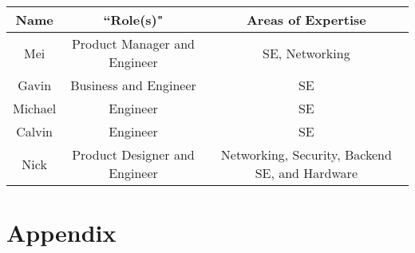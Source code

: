 \documentclass[10pt]{article}
\begin{document}
\begin{center}
    \begin{tabular}{ c | c | c }
        \textbf{Name} & \textbf{``Role(s)"} & \textbf{Areas of Expertise}\\
        \hline
        Mei & Product Manager and Engineer & SE, Networking\\
        Gavin & Business and Engineer & SE\\
        Michael & Engineer & SE\\
        Calvin & Engineer & SE\\
        Nick & Product Designer and Engineer & Networking, Security, Backend SE, and Hardware\\
    \end{tabular}
\end{center}

\section{Appendix}
\end{document}
